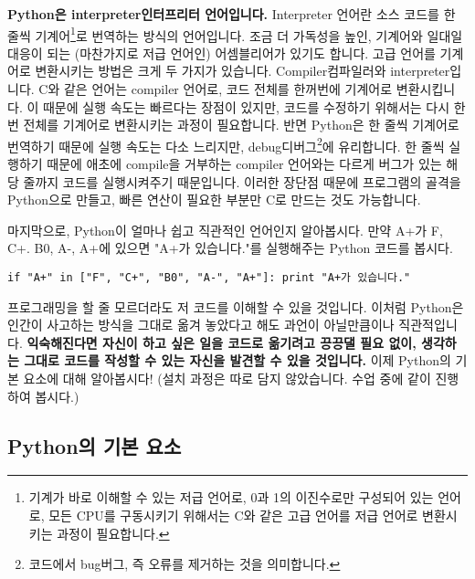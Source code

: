 \documentclass[../main.tex]{subfiles}
\begin{document}
\textbf{Python은 interpreter인터프리터 언어입니다.}
Interpreter 언어란 소스 코드를 한 줄씩 기계어\footnote{기계가 바로 이해할 수 있는 저급 언어로, 0과 1의 이진수로만 구성되어 있는 언어로, 모든 CPU를 구동시키기 위해서는 C와 같은 고급 언어를 저급 언어로 변환시키는 과정이 필요합니다.}로 번역하는 방식의 언어입니다.
조금 더 가독성을 높인, 기계어와 일대일 대응이 되는 (마찬가지로 저급 언어인) 어셈블리어가 있기도 합니다.
고급 언어를 기계어로 변환시키는 방법은 크게 두 가지가 있습니다.
Compiler컴파일러와 interpreter입니다.
C와 같은 언어는 compiler 언어로, 코드 전체를 한꺼번에 기계어로 변환시킵니다.
이 때문에 실행 속도는 빠르다는 장점이 있지만, 코드를 수정하기 위해서는 다시 한 번 전체를 기계어로 변환시키는 과정이 필요합니다.
반면 Python은 한 줄씩 기계어로 번역하기 때문에 실행 속도는 다소 느리지만, debug디버그\footnote{코드에서 bug버그, 즉 오류를 제거하는 것을 의미합니다.}에 유리합니다.
한 줄씩 실행하기 때문에 애초에 compile을 거부하는 compiler 언어와는 다르게 버그가 있는 해당 줄까지 코드를 실행시켜주기 때문입니다.
이러한 장단점 때문에 프로그램의 골격을 Python으로 만들고, 빠른 연산이 필요한 부분만 C로 만드는 것도 가능합니다.

마지막으로, Python이 얼마나 쉽고 직관적인 언어인지 알아봅시다.
만약 A+가 F, C+. B0, A-, A+에 있으면 "A+가 있습니다."를 실행해주는 Python 코드를 봅시다.
\begin{verbatim}
if "A+" in ["F", "C+", "B0", "A-", "A+"]: print "A+가 있습니다."
\end{verbatim}
프로그래밍을 할 줄 모르더라도 저 코드를 이해할 수 있을 것입니다.
이처럼 Python은 인간이 사고하는 방식을 그대로 옮겨 놓았다고 해도 과언이 아닐만큼이나 직관적입니다.
\textbf{익숙해진다면 자신이 하고 싶은 일을 코드로 옮기려고 끙끙댈 필요 없이, 생각하는 그대로 코드를 작성할 수 있는 자신을 발견할 수 있을 것입니다.}
이제 Python의 기본 요소에 대해 알아봅시다!
(설치 과정은 따로 담지 않았습니다. 수업 중에 같이 진행하여 봅시다.)

\subsection{Python의 기본 요소}
\end{document}
